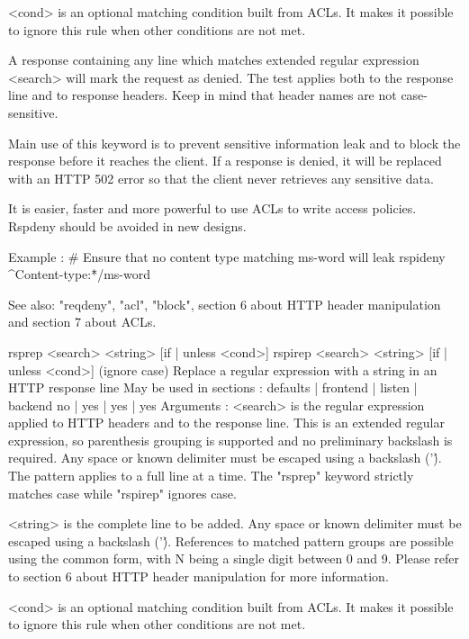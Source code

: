     <cond>    is an optional matching condition built from ACLs. It makes it
              possible to ignore this rule when other conditions are not met.

  A response containing any line which matches extended regular expression
  <search> will mark the request as denied. The test applies both to the
  response line and to response headers. Keep in mind that header names are not
  case-sensitive.

  Main use of this keyword is to prevent sensitive information leak and to
  block the response before it reaches the client. If a response is denied, it
  will be replaced with an HTTP 502 error so that the client never retrieves
  any sensitive data.

  It is easier, faster and more powerful to use ACLs to write access policies.
  Rspdeny should be avoided in new designs.

  Example :
     # Ensure that no content type matching ms-word will leak
     rspideny  ^Content-type:\.*/ms-word

  See also: "reqdeny", "acl", "block", section 6 about HTTP header manipulation
            and section 7 about ACLs.


rsprep  <search> <string> [{if | unless} <cond>]
rspirep <search> <string> [{if | unless} <cond>]  (ignore case)
  Replace a regular expression with a string in an HTTP response line
  May be used in sections :   defaults | frontend | listen | backend
                                 no    |    yes   |   yes  |   yes
  Arguments :
    <search>  is the regular expression applied to HTTP headers and to the
              response line. This is an extended regular expression, so
              parenthesis grouping is supported and no preliminary backslash
              is required. Any space or known delimiter must be escaped using
              a backslash ('\'). The pattern applies to a full line at a time.
              The "rsprep" keyword strictly matches case while "rspirep"
              ignores case.

    <string>  is the complete line to be added. Any space or known delimiter
              must be escaped using a backslash ('\'). References to matched
              pattern groups are possible using the common \N form, with N
              being a single digit between 0 and 9. Please refer to section
              6 about HTTP header manipulation for more information.

    <cond>    is an optional matching condition built from ACLs. It makes it
              possible to ignore this rule when other conditions are not met.

